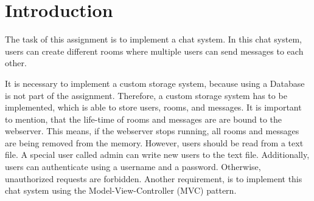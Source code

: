 \section{Introduction}\label{sec:01_intro}
The task of this assignment is to implement a chat system. In this chat system, users can create different rooms where multiple users can send messages to each other.

It is necessary to implement a custom storage system, because using a Database is not part of the assignment.
Therefore, a custom storage system has to be implemented, which is able to store users, rooms, and messages. It is important to mention, that the life-time of rooms and messages are are bound to the webserver. This means, if the webserver stops running, all rooms and messages are being removed from the memory. However, users should be read from a text file. A special user called admin can write new users to the text file.
Additionally, users can authenticate using a username and a password. Otherwise, unauthorized requests are forbidden.
Another requirement, is to implement this chat system using the Model-View-Controller (MVC) pattern.
